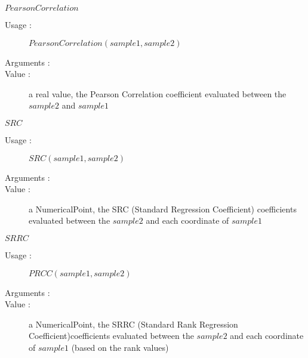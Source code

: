 \begin{description}
\begin{description}
  \item $PearsonCorrelation$
    \begin{description}
    \item[Usage :] $PearsonCorrelation(sample1, sample2)$
    \item[Arguments :] \rule{0pt}{1em}
    \item[Value :]  a real value, the Pearson Correlation coefficient evaluated between the $sample2$ and $sample1$
    \end{description}
    \bigskip

  \item $SRC$
    \begin{description}
    \item[Usage :] $SRC(sample1, sample2)$
    \item[Arguments :] \rule{0pt}{1em}
    \item[Value :]  a NumericalPoint, the SRC (Standard Regression Coefficient)  coefficients evaluated between the $sample2$ and each coordinate of $sample1$
    \end{description}
    \bigskip

  \item $SRRC$
    \begin{description}
    \item[Usage :] $PRCC(sample1, sample2)$
    \item[Arguments :] \rule{0pt}{1em}
    \item[Value :]  a NumericalPoint, the SRRC (Standard Rank Regression Coefficient)coefficients evaluated between the $sample2$ and each coordinate of $sample1$ (based on the rank values)
    \end{description}
    \bigskip


\end{description}
\end{description}
